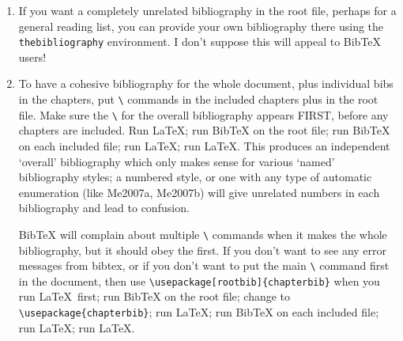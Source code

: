 \documentclass[DIV=9, pagesize=auto]{scrartcl}
\makeatletter
\newcommand*{\cs}[1]{\texttt{\textbackslash#1}}
\newcommand*{\cmd}[1]{\cs{\expandafter\@gobble\string#1}}
\newcommand*{\env}[1]{\texttt{#1}}
\newcommand*{\BibTeX}{Bib\kern-0.08em\TeX\@\xspace}
\def\BibTeX{BibTeX\xspace}%
\makeatother
\begin{document}
\begin{enumerate}
\item \label{item:6} If you want a completely unrelated bibliography in the root file, perhaps
  for a general reading list, you can provide your own bibliography there
  using the \env{thebibliography} environment.  I don't suppose this will appeal
  to \BibTeX users!

\item To have a cohesive bibliography for the whole document, plus individual
  bibs in the chapters, put \cmd{} commands in the included chapters
  plus in the root file.  Make sure the \cmd{} for the overall
  bibliography appears FIRST, before any chapters are included. Run \LaTeX;
  run \BibTeX on the root file; run \BibTeX on each included file; run \LaTeX; 
  run \LaTeX. This produces an independent `overall' bibliography which only
  makes sense for various `named' bibliography styles; a numbered style, or
  one with any type of automatic enumeration (like \textsf{Me2007a}, \textsf{Me2007b}) will 
  give unrelated numbers in each bibliography and lead to confusion.

  \begin{sloppypar}
    \BibTeX will complain about multiple \cmd{\bibdata} commands when it makes
    the whole bibliography, but it should obey the first.  If you don't 
    want to see any error messages from bibtex, or if you don't want to put 
    the main \cmd{} command first in the document, then use 
    \verb+\usepackage[rootbib]{chapterbib}+ when you run \LaTeX\ first; run \BibTeX 
    on the root file; change to \verb+\usepackage{chapterbib}+; run \LaTeX; run 
    \BibTeX on each included file; run \LaTeX; run \LaTeX.
  \end{sloppypar}


\end{enumerate}
\end{document}

